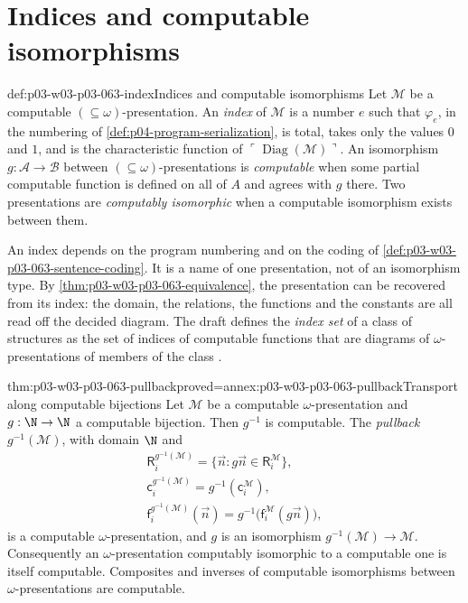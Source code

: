 \section{Indices and computable isomorphisms}
\label{sec:p03-w03-p03-063-indices}

\begin{hbdefinition}{def:p03-w03-p03-063-index}{Indices and computable isomorphisms}
Let \(\mathcal M\) be a computable \((\subseteq\omega)\)-presentation.  An
\emph{index} of \(\mathcal M\) is a number \(e\) such that \(\varphi_e\), in
the numbering of \cref{def:p04-program-serialization}, is total, takes only the
values \(0\) and \(1\), and is the characteristic function of
\(\ulcorner\operatorname{Diag}(\mathcal M)\urcorner\).  An isomorphism
\(g:\mathcal A\to\mathcal B\) between \((\subseteq\omega)\)-presentations is
\emph{computable} when some partial computable function is defined on all of
\(A\) and agrees with \(g\) there.  Two presentations are \emph{computably
isomorphic} when a computable isomorphism exists between them.
\end{hbdefinition}

An index depends on the program numbering and on the coding of
\cref{def:p03-w03-p03-063-sentence-coding}.  It is a name of one
presentation, not of an isomorphism type.  By
\cref{thm:p03-w03-p03-063-equivalence}, the presentation can be recovered
from its index: the domain, the relations, the functions and the constants
are all read off the decided diagram.  The draft defines the \emph{index set}
of a class of structures as the set of indices of computable functions that
are diagrams of \(\omega\)-presentations of members of the class
\cite[p.~124, note]{Montalban2019CSTDraft}.

\begin{hblemma}{thm:p03-w03-p03-063-pullback}{proved=annex:p03-w03-p03-063-pullback}{Transport along computable bijections}
Let \(\mathcal M\) be a computable \(\omega\)-presentation and
\(g:\N\to\N\) a computable bijection.  Then \(g^{-1}\) is computable.  The
\emph{pullback} \(g^{-1}(\mathcal M)\), with domain \(\N\) and
\begin{gather*}
 \mathsf R_i^{g^{-1}(\mathcal M)}=\{\vec n:g\vec n\in\mathsf R_i^{\mathcal M}\},\\
 \mathsf c_i^{g^{-1}(\mathcal M)}=g^{-1}(\mathsf c_i^{\mathcal M}),\\
 \mathsf f_i^{g^{-1}(\mathcal M)}(\vec n)=g^{-1}\bigl(\mathsf f_i^{\mathcal M}(g\vec n)\bigr),
\end{gather*}
is a computable \(\omega\)-presentation, and \(g\) is an isomorphism
\(g^{-1}(\mathcal M)\to\mathcal M\).  Consequently an
\(\omega\)-presentation computably isomorphic to a computable one is itself
computable.  Composites and inverses of computable isomorphisms between
\(\omega\)-presentations are computable.
\end{hblemma}

